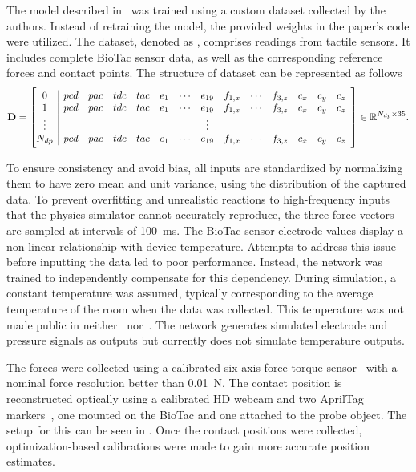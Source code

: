 The model described in~ was trained using a custom dataset collected by the authors. Instead of retraining the model, the provided weights in the paper's code were utilized. The dataset, denoted as , comprises  readings from tactile sensors. It includes complete BioTac sensor data, as well as the corresponding reference forces and contact points. The structure of dataset  can be represented as follows
%
\begin{equation} \label{eq:dl-data-matrix}
	\mat{D} =
	\left[\begin{array}{@{}c|cccccccccccccc@{}}
		0       & pcd & pac & tdc & tac & e_{1} & \cdots & e_{19} & f_{1,x} & \cdots & f_{3,z} & c_x & c_y & c_z \\
		1       & pcd & pac & tdc & tac & e_{1} & \cdots & e_{19} & f_{1,x} & \cdots & f_{3,z} & c_x & c_y & c_z \\
		\vdots  &  &  &  &  &  &  & \vdots &  &  &  &  &  &  \\
		N_{dp}  & pcd & pac & tdc & tac & e_{1} & \cdots & e_{19} & f_{1,x} & \cdots & f_{3,z} & c_x & c_y & c_z
		\end{array}\right] \inR{N_{dp} \times 35}.
\end{equation}

To ensure consistency and avoid bias, all inputs are standardized by normalizing them to have zero mean and unit variance, using the distribution of the captured data. To prevent overfitting and unrealistic reactions to high-frequency inputs that the physics simulator cannot accurately reproduce, the three force vectors are sampled at intervals of \SI{100}{\milli\second}. The BioTac sensor electrode values display a non-linear relationship with device temperature. Attempts to address this issue before inputting the data led to poor performance. Instead, the network was trained to independently compensate for this dependency. During simulation, a constant temperature was assumed, typically corresponding to the average temperature of the room when the data was collected. This temperature was not made public in neither~\cite{biotac-dataset} nor~\cite{simulation-of-the-syntouch-biotac-sensor}. The network generates simulated electrode and pressure signals as outputs but currently does not simulate temperature outputs.\medskip

The forces were collected using a calibrated six-axis force-torque sensor~\cite{ati:-6-axis-force-and-torque-sensor-nano17-series} with a nominal force resolution better than \SI{0.01}{\newton}. The contact position is reconstructed optically using a calibrated HD webcam and two AprilTag markers~\cite{apriltag:-a-robust-and-flexible-visual-fiducial-system}, one mounted on the BioTac and one attached to the probe object. The setup for this can be seen in . Once the contact positions were collected, optimization-based calibrations were made to gain more accurate position estimates. \medskip

